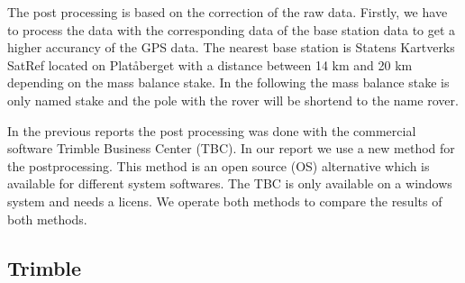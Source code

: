 
The post processing is based on the correction of the raw data.
Firstly, we have to process the data with the corresponding data of the base station data to get a higher accurancy of the GPS data.
The nearest base station is Statens Kartverks SatRef located on Platåberget with a distance between 14 km and 20 km depending on the mass balance stake.
In the following the mass balance stake is only named stake and the pole with the rover will be shortend to the name rover.
\medskip

In the previous reports the post processing was done with the commercial software Trimble Business Center (TBC). 
In our report we use a new method for the postprocessing. 
This method is an open source (OS) alternative which is available for different system softwares. 
The TBC is only available on a windows system and needs a licens. 
We operate both methods to compare the results of both methods.
\medskip

\subsection{Trimble}

